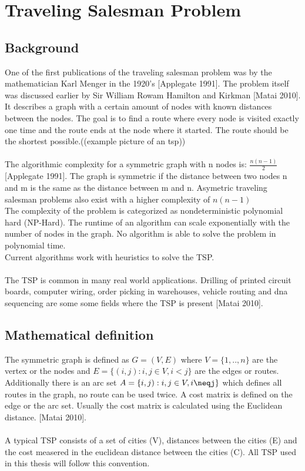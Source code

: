 \chapter{Traveling Salesman Problem}
\label{chap:tsp}
\section{Background}
One of the first publications of the traveling salesman problem was by the mathematician Karl Menger in the 1920's [Applegate 1991]. The problem itself was discussed earlier by Sir William Rowam Hamilton and Kirkman [Matai 2010]. It describes a graph with a certain amount of nodes with known distances between the nodes. The goal is to find a route where every node is visited exactly one time and the route ends at the node where it started. The route should be the shortest possible.((example picture of an tsp))\\\\
The algorithmic complexity for a symmetric graph with n nodes is: $\frac{n(n-1)}{2}$ [Applegate 1991].
The graph is symmetric if the distance between two nodes n and m is the same as the distance between m and n. Asymetric traveling salesman problems also exist with a higher complexity of $n(n-1)$\\
The complexity of the problem is categorized as nondeterministic polynomial hard (NP-Hard). The runtime of an algorithm can scale exponentially with the number of nodes in the graph. No algorithm is able to solve the problem in polynomial time.\\
Current algorithms work with heuristics to solve the TSP.\\\\
The TSP is common in many real world applications. Drilling of printed circuit boards, computer wiring, order picking in warehouses, vehicle routing and dna sequencing are some some fields where the TSP is present [Matai 2010].
\section{Mathematical definition}
The symmetric graph is defined as $G=(V,E)$ where $V=\{1,..,n\}$ are the vertex or the nodes and $E=\{(i,j):i,j\in V, i<j\}$ are the edges or routes. Additionally there is an arc set $A=\{i,j):i,j\in V, i\neqj\}$ which defines all routes in the graph, no route can be used twice. A cost matrix is defined on the edge or the arc set. Usually the cost matrix is calculated using the Euclidean distance. [Matai 2010].\\\\
A typical TSP consists of a set of cities (V), distances between the cities (E) and the cost measered in the euclidean distance between the cities (C). All TSP used in this thesis will follow this convention. 


 


